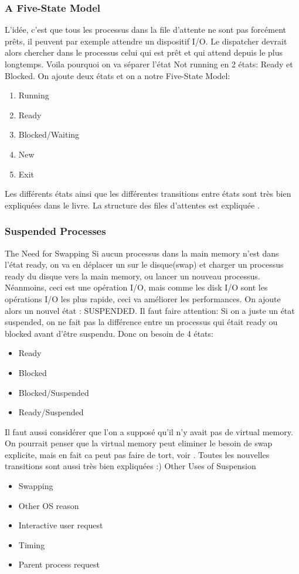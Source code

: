\subsubsection{A Five-State Model}
L'idée, c'est que tous les processus dans la file d'attente ne sont pas forcément prêts, il peuvent par exemple attendre un dispositif I/O.
Le dispatcher devrait alors chercher dans le processus celui qui est prêt et qui attend depuis le plus longtemps.
Voila pourquoi on va séparer l'état Not running en 2 états: Ready et Blocked.
On ajoute deux états et on a notre Five-State Model:
\begin{enumerate}
  \item Running
  \item Ready
  \item Blocked/Waiting
  \item New
  \item Exit
\end{enumerate}
Les différents états ainsi que les différentes transitions entre états sont très bien expliquées dans le livre.
La structure des files d'attentes est expliquée \cite[p.~140]{stallings}.

\subsubsection{Suspended Processes}
The Need for Swapping
Si aucun processus dans la main memory n'est dans l'état ready, on va en déplacer un sur le disque(swap) et charger un processus ready du disque vers la main memory, ou lancer un nouveau processus.
Néanmoins, ceci est une opération I/O, mais comme les disk I/O sont les opérations I/O les plus rapide, ceci va améliorer les performances.
On ajoute alors un nouvel état : SUSPENDED.
Il faut faire attention: Si on a juste un état suspended, on ne fait pas la différence entre un processus qui était ready ou blocked avant d'être suspendu.
Donc on besoin de 4 états:
\begin{itemize}
  \item Ready
  \item Blocked
  \item Blocked/Suspended
  \item Ready/Suspended
\end{itemize}
Il faut aussi considérer que l'on a supposé qu'il n'y avait pas de virtual memory.
On pourrait penser que la virtual memory peut eliminer le besoin de swap explicite, mais en fait ca peut pas faire de tort, voir \cite[p.~142]{stallings}.
Toutes les nouvelles transitions sont aussi très bien expliquées :)
Other Uses of Suspension
\begin{itemize}
  \item Swapping
  \item Other OS reason
  \item Interactive user request
  \item Timing
  \item Parent process request
\end{itemize}

